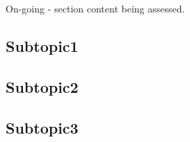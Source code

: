 \begin{notes}
    On-going - section content being assessed.
\end{notes}

\subsection{Subtopic1}


\subsection{Subtopic2}


\subsection{Subtopic3}
